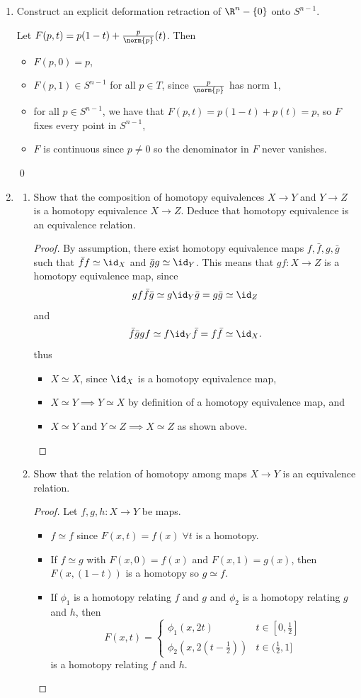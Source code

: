 \documentclass[12pt,letterpaper]{article}
\begin{document}
\begin{enumerate}
\item Construct an explicit deformation retraction of $\R^n - \{0\}$ onto $S^{n-1}$. 

\answer Let $F(p,t)=p(1-t)+\frac{p}{\norm{p}}(t)$. Then 
\begin{itemize}
\item $F(p,0)=p$, 
\item $F(p,1)\in S^{n-1}$ for all $p\in T$, since $\frac{p}{\norm{p}}$ has norm $1$, 
\item for all $p\in S^{n-1}$, we have that $F(p,t)=p(1-t)+p(t)=p$, so $F$ fixes every point in $S^{n-1}$,
\item $F$ is continuous since $p\neq0$ so the denominator in $F$ never vanishes.
\end{itemize}\qed

\pagebreak
\item 
\begin{enumerate}[label=(\alph*)]
\item Show that the composition of homotopy equivalences $X\to Y$ and $Y\to Z$ is a
homotopy equivalence $X\to Z$. Deduce that homotopy equivalence is an equivalence
relation.
\begin{proof}
By assumption, there exist homotopy equivalence maps $f,\bar{f}, g, \bar{g}$ such that ${\bar{f}f\simeq\id_X}$ and ${\bar{g}g\simeq\id_Y}$. This means that $gf:X\to Z$ is a homotopy equivalence map, since 
$$gf\bar{f}\bar{g}\simeq g\id_Y \bar{g} = g\bar{g} \simeq \id_Z$$ 
and
$$\bar{f}\bar{g}gf\simeq f\id_Y \bar{f} = f\bar{f} \simeq \id_X. $$
thus 
\begin{itemize}
\item $X \simeq X$, since $\id_X$ is a homotopy equivalence map,
\item $X \simeq Y \implies Y \simeq X$ by definition of a homotopy equivalence map, and 
\item $X\simeq Y$ and $Y\simeq Z \implies X \simeq Z$ as shown above. \qedwhite 
\end{itemize}
\let\qed\relax
\end{proof}

\item Show that the relation of homotopy among maps $X\to Y$ is an equivalence relation.
\begin{proof} Let $f,g,h:X\to Y$ be maps. 
\begin{itemize}
\item $f \simeq f$ since $F(x,t) = f(x) \; \forall t$ is a homotopy. 
\item If $f\simeq g$ with $F(x,0)=f(x)$ and $F(x,1)=g(x)$, then $F(x,(1-t))$ is a homotopy so $g \simeq f$. 
\item If $\phi_1$ is a homotopy relating $f$ and $g$ and $\phi_2$ is a homotopy relating $g$ and $h$, then 
$$F(x,t)=
\begin{cases}
\phi_1(x,2t) & t\in[0,\frac{1}{2}] \\ 
\phi_2(x,2(t-\frac{1}{2})) & t\in(\frac{1}{2}, 1]
\end{cases}
$$
is a homotopy relating $f$ and $h$.\qedwhite
\end{itemize}
\let\qed\relax
\end{proof}


\end{enumerate}
\end{enumerate}
\end{document}
